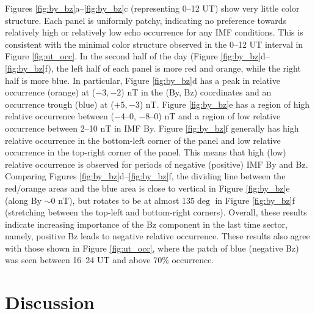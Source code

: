 
Figures \ref{fig:by_bz}a--\ref{fig:by_bz}c (representing 0--12 UT) show very little color structure.  Each panel is uniformly patchy, indicating no preference towards relatively high or relatively low echo occurrence for any IMF conditions. This is consistent with the minimal color structure observed in the 0--12 UT interval in Figure \ref{fig:ut_occ}. In the second half of the day (Figure \ref{fig:by_bz}d--\ref{fig:by_bz}f), the left half of each panel is more red and orange, while the right half is more blue. In particular, Figure \ref{fig:by_bz}d has a peak in relative occurrence (orange) at (\(-3, -2\)) nT in the (By, Bz) coordinates and an occurrence trough (blue) at (\(+5, -3\)) nT. Figure \ref{fig:by_bz}e has a region of high relative occurrence between (\(-\)4--0, \(-\)8--0) nT and a region of low relative occurrence between 2--10 nT in IMF By.  Figure \ref{fig:by_bz}f generally has high relative occurrence in the bottom-left corner of the panel and low relative occurrence in the top-right corner of the panel. This means that high (low) relative occurrence is observed for periods of negative (positive) IMF By and Bz. Comparing Figures \ref{fig:by_bz}d--\ref{fig:by_bz}f, the dividing line between the red/orange areas and the blue area is close to vertical in Figure \ref{fig:by_bz}e (along By \(\sim\)0 nT), but rotates to be at almost 135\(\deg\) in Figure \ref{fig:by_bz}f (stretching between the top-left and bottom-right corners). Overall, these results indicate increasing importance of the Bz component in the last time sector, namely, positive Bz leads to negative relative occurrence. These results also agree with those shown in Figure \ref{fig:ut_occ}, where the patch of blue (negative Bz) was seen between 16--24 UT and above 70\% occurrence.



\section{Discussion}

